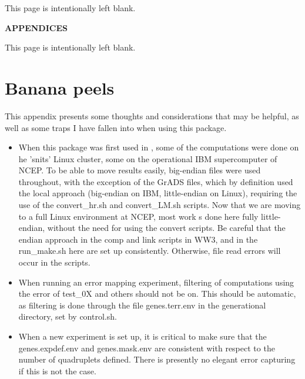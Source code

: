 \documentclass[12pt]{article}
\newcommand{\pstyle}{myheadings}
\newcommand{\ws}{WW3}
\newcommand{\file}{\sf}
\newcommand{\pb}{\strut \vfill \pagebreak}
\newcommand{\bpage}{\vfill \pagebreak \strut

\vspace{2.5in} \centerline{This page is intentionally left blank.}}
\newcommand{\bpagea}{\strut

\vspace{2.5in} \centerline{This page is intentionally left blank.}}
\newcommand{\newsec}{\setcounter{equation}{0}
                      \setcounter{myfigno}{0}
                      \setcounter{mytabno}{0}}
\newcounter{myfigno}[section]
\newcounter{mytabno}[section]
\begin{document}
\pb
\setcounter{footnote}{0}


%


\pb
\pagestyle{empty}
\bpagea

\pb \strut
\pagestyle{empty}


\vspace{2.5in} \centerline{\large \bf APPENDICES}
\appendix

\bpage
\pb \newsec \setcounter{page}{1} \pagestyle{\pstyle}
\renewcommand{\thepage}{\thesection.\arabic{page}}
\section{Banana peels} \label{app:hints}

\noindent
This appendix presents some thoughts and considerations that may be helpful,
as well as some traps I have fallen into when using this package. 

\begin{itemize}

\item When this package was first used in \citep{tol:MMAB10d}, some of the
  computations were done on he 'snits' Linux cluster, some on the operational
  IBM supercomputer of NCEP. To be able to move results easily, big-endian
  files were used throughout, with the exception of the GrADS files, which by
  definition used the local approach (big-endian on IBM, little-endian on
  Linux), requiring the use of the {\file convert\_hr.sh} and {\file
    convert\_LM.sh } scripts. Now that we are moving to a full Linux
  environment at NCEP, most work s done here fully little-endian, without the
  need for using the convert scripts. Be careful that the endian approach in
  the {\file comp} and {\file link} scripts in \ws, and in the {\file
    run\_make.sh} here are set up consistently. Otherwise, file read errors
  will occur in the scripts.

\item When running an error mapping experiment, filtering of computations
  using the error of {\file test\_0X} and others should not be on. This should
  be automatic, as filtering is done through the file {\file genes.terr.env}
  in the generational directory, set by {\file control.sh}.

\item When a new experiment is set up, it is critical to make sure that the
  {\file genes.expdef.env} and {\file genes.mask.env} are consistent with
  respect to the number of quadruplets defined. There is presently no elegant
  error capturing if this is not the case. 

\end{itemize}
\end{document}
